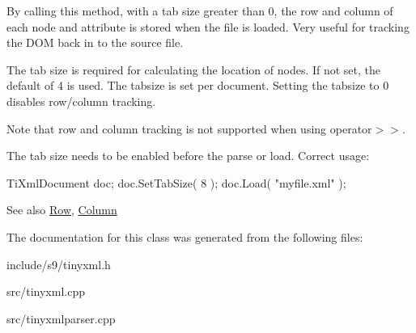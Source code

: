 \-By calling this method, with a tab size greater than 0, the row and column of each node and attribute is stored when the file is loaded. \-Very useful for tracking the \-D\-O\-M back in to the source file.

\-The tab size is required for calculating the location of nodes. \-If not set, the default of 4 is used. \-The tabsize is set per document. \-Setting the tabsize to 0 disables row/column tracking.

\-Note that row and column tracking is not supported when using operator$>$$>$.

\-The tab size needs to be enabled before the parse or load. \-Correct usage\-: \begin{DoxyVerb}
		TiXmlDocument doc;
		doc.SetTabSize( 8 );
		doc.Load( "myfile.xml" );
		\end{DoxyVerb}


\begin{DoxySeeAlso}{\-See also}
\hyperlink{classTiXmlBase_a024bceb070188df92c2a8d8852dd0853}{\-Row}, \hyperlink{classTiXmlBase_ab54bfb9b70fe6dd276e7b279cab7f003}{\-Column} 
\end{DoxySeeAlso}


\-The documentation for this class was generated from the following files\-:\begin{DoxyCompactItemize}
\item 
include/s9/tinyxml.\-h\item 
src/tinyxml.\-cpp\item 
src/tinyxmlparser.\-cpp\end{DoxyCompactItemize}
